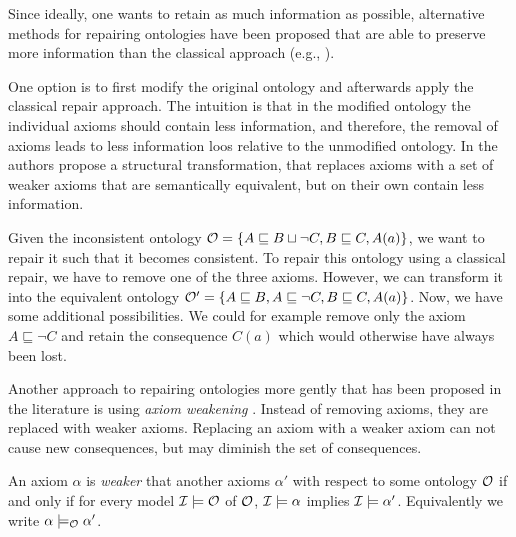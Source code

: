 Since ideally, one wants to retain as much information as possible, alternative methods for repairing ontologies have been proposed that are able to preserve more information than the classical approach (e.g., \cite{du2014practical,AMAI-2018,baader2018making,troquard2018repairing,confalonieri2020towards,horridge2008laconic,lam2008fine}).

One option is to first modify the original ontology and afterwards apply the classical repair approach. The intuition is that in the modified ontology the individual axioms should contain less information, and therefore, the removal of axioms leads to less information loos relative to the unmodified ontology. In \cite{horridge2008laconic} the authors propose a structural transformation, that replaces axioms with a set of weaker axioms that are semantically equivalent, but on their own contain less information.

\begin{example}
Given the inconsistent ontology $\mathcal{O} = \{ A \sqsubseteq B \sqcup \lnot C, B \sqsubseteq C, A(a) \}$, we want to repair it such that it becomes consistent. To repair this ontology using a classical repair, we have to remove one of the three axioms. However, we can transform it into the equivalent ontology $\mathcal{O}' = \{ A \sqsubseteq B, A \sqsubseteq \lnot C, B \sqsubseteq C, A(a) \}$. Now, we have some additional possibilities. We could for example remove only the axiom $A \sqsubseteq \lnot C$ and retain the consequence $C(a)$ which would otherwise have always been lost.
\end{example}

Another approach to repairing ontologies more gently that has been proposed in the literature is using \emph{axiom weakening} \cite{troquard2018repairing,confalonieri2020towards,confalonieri2022irresistible,baader2018making,lam2008fine}. Instead of removing axioms, they are replaced with weaker axioms. Replacing an axiom with a weaker axiom can not cause new consequences, but may diminish the set of consequences.

\begin{definition}
An axiom $\alpha$ is \emph{weaker} that another axioms $\alpha'$ with respect to some ontology $\mathcal{O}$ if and only if for every model $\mathcal{I} \models \mathcal{O}$ of $\mathcal{O}$, $\mathcal{I} \models \alpha$ implies $\mathcal{I} \models \alpha'$. Equivalently we write $\alpha \models_\mathcal{O} \alpha'$.
\end{definition}

